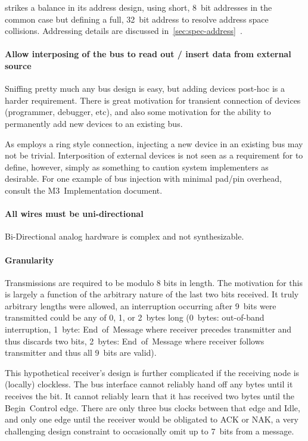 \bus strikes a balance in its address design, using short, 8~bit addresses in
the common case but defining a full, 32~bit address to resolve address space
collisions. Addressing details are discussed
in~\ref{sec:spec-address}~.

\paragraph{Allow interposing of the bus to read out / insert data from
external source}
Sniffing pretty much any bus design is easy, but adding devices post-hoc is a
harder requirement. There is great motivation for transient connection of
devices (programmer, debugger, etc), and also some motivation for the ability
to permanently add new devices to an existing bus.

As \bus employs a ring style connection, injecting a new device in an existing
bus may not be trivial. Interposition of external devices is not seen as a
requirement for \bus to define, however, simply as something to caution system
implementers as desirable. For one example of bus injection with minimal
pad/pin overhead, consult the M3~Implementation document.

\paragraph{All wires must be uni-directional}
Bi-Directional analog hardware is complex and not synthesizable.

\paragraph{Granularity}
\label{sec:design-granularity}
Transmissions are required to be modulo 8 bits in length. The motivation for
this is largely a function of the arbitrary nature of the last two bits
received. It truly arbitrary lengths were allowed, an interruption occurring
after 9~bits were transmitted could be any of 0, 1, or 2~bytes long
(0~bytes: out-of-band interruption, 1~byte: End~of~Message where receiver
precedes transmitter and thus discards two bits, 2~bytes: End~of~Message where
receiver follows transmitter and thus all 9~bits are valid).

This hypothetical receiver's design is further complicated if the receiving
node is (locally) clockless. The bus interface cannot reliably hand off any
bytes until it receives the \textit{} bit. It cannot reliably learn
that it has received two bytes until the Begin~Control edge. There are only
three bus clocks between that edge and Idle, and only one edge until the
receiver would be obligated to ACK or NAK, a very challenging design
constraint to occasionally omit up to 7~bits from a message.

